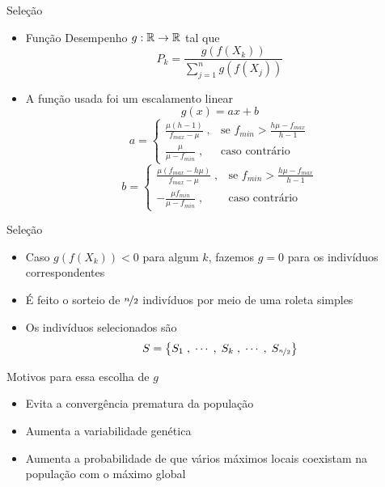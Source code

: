 \newcommand{\fmin}{f_{min}}
\newcommand{\fmax}{f_{max}}

\begin{frame}{Seleção}
  \begin{itemize}
    \item Função Desempenho $g : \mathbb{R} \rightarrow \mathbb{R}$ tal que
          $$ P_k = \frac{g(f(X_k))}{\sum_{j = 1}^n g(f(X_j))} $$
    \item A função usada foi um escalamento linear $$ g(x) = ax + b $$
          $$
            a =
            \begin{cases}
              \frac{\mu (h - 1)}{\fmax - \mu} \;, & \text{se } \fmin > \frac{h\mu - \fmax}{h - 1} \\
              \frac{\mu}{\mu - \fmin}         \;, & \text{caso contrário}
            \end{cases}
          $$
          $$
            b =
            \begin{cases}
              \frac{\mu (\fmax - h\mu)}{\fmax - \mu} \;, & \text{se } \fmin > \frac{h\mu - \fmax}{h - 1} \\
              - \frac{\mu\fmin}{\mu - \fmin}         \;, & \text{caso contrário}
            \end{cases}
          $$
  \end{itemize}
\end{frame}

\begin{frame}{Seleção}
  \begin{itemize}
    \item Caso $g(f(X_k)) < 0$ para algum $k$, fazemos $g = 0$
          para os indivíduos correspondentes
    \item É feito o sorteio de $\nicefrac{n}{2}$ indivíduos por meio de
          uma roleta simples
    \item Os indivíduos selecionados são
          $$ S = \left\{ S_1\;, \;\cdots\;,  \;S_k\;, \;\cdots\;, \;S_{\nicefrac{n}{2}} \right\} $$
  \end{itemize}
  \vfill
  \begin{block}{Motivos para essa escolha de $g$}
    \begin{itemize}
      \item Evita a convergência prematura da população
      \item Aumenta a variabilidade genética
      \item Aumenta a probabilidade de que vários máximos locais coexistam
            na população com o máximo global
    \end{itemize}
  \end{block}
\end{frame}

